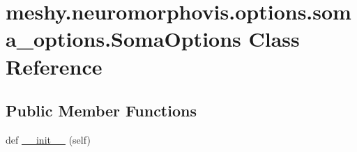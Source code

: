 \hypertarget{classmeshy_1_1neuromorphovis_1_1options_1_1soma__options_1_1SomaOptions}{}\section{meshy.\+neuromorphovis.\+options.\+soma\+\_\+options.\+Soma\+Options Class Reference}
\label{classmeshy_1_1neuromorphovis_1_1options_1_1soma__options_1_1SomaOptions}


 


\subsection*{Public Member Functions}
\begin{DoxyCompactItemize}
\item 
def \hyperlink{classmeshy_1_1neuromorphovis_1_1options_1_1soma__options_1_1SomaOptions_a5a47e523eb836fd2019b3c493a938ba7}{\+\_\+\+\_\+init\+\_\+\+\_\+} (self)
\end{DoxyCompactItemize}
